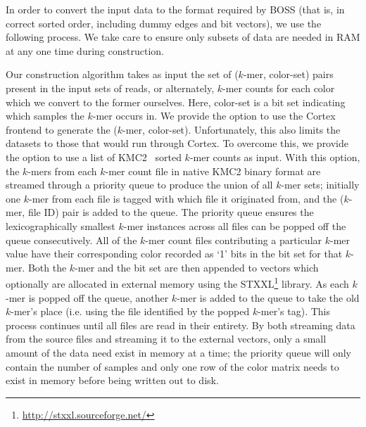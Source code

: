 
In order to convert the input data to the format required by BOSS (that is, in correct sorted order, including dummy edges and bit vectors), we use the following process.  We take care to ensure only subsets of data are needed in RAM at any one time during construction.


Our construction algorithm takes as input the set of ($k$-mer, color-set) pairs present in the input sets of reads, or alternately, $k$-mer counts for each color which we convert to the former ourselves.
Here, color-set is a bit set indicating which samples the $k$-mer occurs in.
We provide the option to use the {\sc Cortex} frontend to generate the ($k$-mer, color-set). Unfortunately, this also limits the datasets to those that would run through {\sc Cortex}.  To overcome this, we provide the option to use a list of KMC2~\citep{KMC2} sorted $k$-mer counts as input.  With this option, the $k$-mers from each $k$-mer count file in native KMC2 binary format are streamed through a priority queue to produce the union of all $k$-mer sets; initially one $k$-mer from each file is tagged with  which file it originated from, and the ($k$-mer, file ID) pair is added to the queue.   The priority queue ensures the lexicographically smallest $k$-mer instances across all files can be popped off the queue consecutively.  All of the $k$-mer count files contributing a particular $k$-mer value have their corresponding color recorded as `1' bits in the bit set for that $k$-mer.  Both the $k$-mer and the bit set are then appended to vectors which optionally are allocated in external memory using the STXXL\footnote{\url{http://stxxl.sourceforge.net/}} library.   As each $k$-mer is popped off the queue, another $k$-mer is added to the queue to take the old $k$-mer's place (i.e. using the file identified by the popped $k$-mer's tag).  This process continues until all files are read in their entirety.  By both streaming data from the source files and streaming it to the external vectors, only a small amount of the data need exist in memory at a time; the priority queue will only contain the number of samples and only one row of the color matrix needs to exist in memory before being written out to disk.

